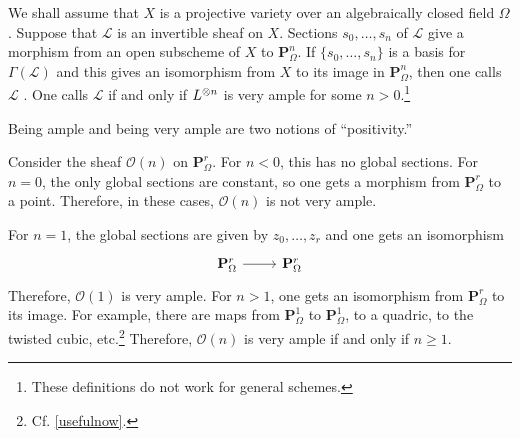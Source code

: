 \documentclass [11 pt, oneside] {article}
\begin{document}
We shall assume that $X$ is a projective variety over an algebraically closed field $\Omega$. Suppose that $\mathscr{L}$ is an invertible sheaf on $X$. Sections $s_0,\hdots, s_n$ of $\mathscr{L}$ give a morphism from an open subscheme of $X$ to $\mathbf{P}^n_\Omega$.
If $\{s_0,\hdots,s_n\}$ is a basis for $\Gamma(\mathscr{L})$ and this gives an isomorphism from $X$ to its image in $\mathbf{P}^n_\Omega$, then one calls $\mathscr{L}$ . One calls $\mathscr{L}$  if and only if $\relax{L}^{\otimes n}$ is very ample for some $n>0$.\footnote{These definitions do not work for general schemes.}

\begin{remark}
	Being ample and being very ample are two notions of ``positivity.''
\end{remark}

\begin{example}[ ]\label{}\text{}
Consider the sheaf $\mathscr{O}(n)$ on $\mathbf{P}^r_\Omega$. For $n<0$, this has no global sections. For $n=0$, the only global sections are constant, so one gets a morphism from $\mathbf{P}^r_\Omega$ to a point. Therefore, in these cases, $\mathscr{O}(n)$ is not very ample.

For $n=1$, the global sections are given by $z_0,\hdots, z_r$ and one gets an isomorphism 
\[
\begin{tikzcd}
\mathbf{P}^r_\Omega\ar[r]& \mathbf{P}^r_\Omega
\end{tikzcd}
\]
Therefore, $\mathscr{O}(1)$ is very ample. For $n>1$, one gets an isomorphism from $\mathbf{P}^r_\Omega$ to its image. For example, there are maps from $\mathbf{P}^1_\Omega$ to $\mathbf{P}^1_\Omega$, to a quadric, to the twisted cubic, etc.\footnote{Cf. \cref{usefulnow}.} Therefore, $\mathscr{O}(n)$ is very ample if and only if $n\ge 1$.
\end{example}
\end{document}
